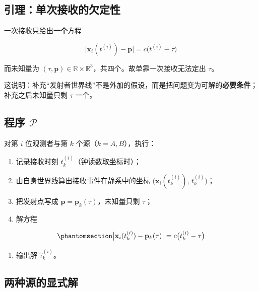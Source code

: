 \documentclass[
  chinese,
  a4paper,
  UTF8,
  12pt,
  oneside,
  openany]{ctexbook}
\providecommand{\tightlist}{%
  \setlength{\itemsep}{0pt}\setlength{\parskip}{0pt}}
\theoremstyle{plain}
\theoremstyle{plain}
\theoremstyle{plain}
\theoremstyle{definition}
\theoremstyle{plain}
\theoremstyle{plain}
\theoremstyle{remark}
\begin{document}
\subsection{引理：单次接收的欠定性}\label{ux5f15ux7406ux5355ux6b21ux63a5ux6536ux7684ux6b20ux5b9aux6027}

一次接收只给出\textbf{一个}方程

\[
\bigl|\mathbf{x}_{i}(t^{(i)})- \mathbf{p}\bigr|=c\bigl(t^{(i)}-\tau\bigr)
\]

而未知量为
\((\tau,\mathbf{p})\in\mathbb{R}\times\mathbb{R}^{3}\)，共四个。故单靠一次接收无法定出
\(\tau\)。

这说明：补充``发射者世界线''不是外加的假设，而是把问题变为可解的\textbf{必要条件}；补充之后未知量只剩
\(\tau\) 一个。

\subsection{\texorpdfstring{程序
\(\mathcal{P}\)}{程序 \textbackslash mathcal\{P\}}}\label{ux7a0bux5e8f-mathcalp}

对第 \(i\) 位观测者与第 \(k\) 个源（\(k=A,B\)），执行：

\begin{enumerate}
\def\labelenumi{\arabic{enumi}.}
\tightlist
\item
  记录接收时刻 \(t^{(i)}_{k}\)（钟读数取坐标时）；
\item
  由自身世界线算出接收事件在静系中的坐标
  \(\bigl(\mathbf{x}_{i}(t^{(i)}_{k}),\,t^{(i)}_{k}\bigr)\)；
\item
  把发射点写成 \(\mathbf{p}=\mathbf{p}_{k}(\tau)\)，未知量只剩
  \(\tau\)；
\item
  解方程
\end{enumerate}

\begin{equation}\protect\phantomsection\label{eq-measure-core}{
\bigl|\mathbf{x}_{i}(t^{(i)}_{k})-\mathbf{p}_{k}(\tau)\bigr|=c\bigl(t^{(i)}_{k}-\tau\bigr)
}\end{equation}

\begin{enumerate}
\def\labelenumi{\arabic{enumi}.}
\setcounter{enumi}{4}
\tightlist
\item
  输出解 \(\widehat{\tau}^{(i)}_{k}\)。
\end{enumerate}

\subsection{两种源的显式解}\label{ux4e24ux79cdux6e90ux7684ux663eux5f0fux89e3}
\end{document}
